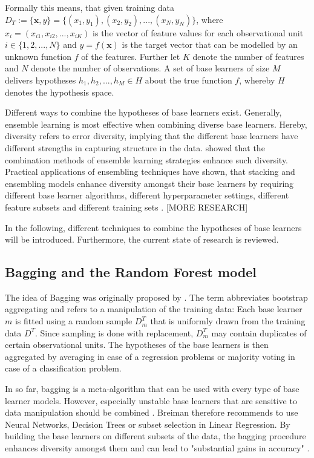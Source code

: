 \documentclass[12pt]{article}
\begin{document}
Formally this means, that given training data $D_T := \{\mathbf{x}, y\} = \{(x_1, y_1), (x_2, y_2),..., (x_N, y_N)\}$, where $x_i = (x_{i1}, x_{i2},..., x_{iK})$ is the vector of feature values for each observational unit $i \in \{1, 2,..., N\}$ and $y = f(\mathbf{x})$ is the target vector that can be modelled by an unknown function $f$ of the features. Further let $K$ denote the number of features and $N$ denote the number of observations. A set of base learners of size $M$ delivers hypotheses $h_1, h_2,..., h_M \in H$ about the true function $f$, whereby $H$ denotes the hypothesis space.

Different ways to combine the hypotheses of base learners exist. Generally, ensemble learning is most effective when combining diverse base learners. Hereby, diversity refers to error diversity, implying that the different base learners have different strengths in capturing structure in the data. \cite{brown2005diversity} showed that the combination methods of ensemble learning strategies enhance such diversity. Practical applications of ensembling techniques have shown, that stacking and ensembling models enhance diversity amongst their base learners by requiring different base learner algorithms, different hyperparameter settings, different feature subsets and different training sets \citep{online2017stacking}. [MORE RESEARCH]

In the following, different techniques to combine the hypotheses of base learners will be introduced. Furthermore, the current state of research is reviewed. 

\subsection{Bagging and the Random Forest model}
The idea of Bagging was originally proposed by \cite{breiman1996bagging}. The term abbreviates bootstrap aggregating and refers to a manipulation of the training data: Each base learner $m$ is fitted using a random sample $D^T_m$ that is uniformly drawn from the training data $D^T$. Since sampling is done with replacement, $D^T_m$ may contain duplicates of certain observational units. The hypotheses of the base learners is then aggregated by averaging in case of a regression problems or majority voting in case of a classification problem. 

In so far, bagging is a meta-algorithm that can be used with every type of base learner models. However, especially unstable base learners that are sensitive to data manipulation should be combined \citep[p.124]{breiman1996bagging}. Breiman therefore recommends to use Neural Networks, Decision Trees	or subset selection in Linear Regression. By building the base learners on different subsets of the data, the bagging procedure enhances diversity amongst them and can lead to "substantial gains in accuracy" \citep[p.123]{breiman1996bagging}.
\end{document}
